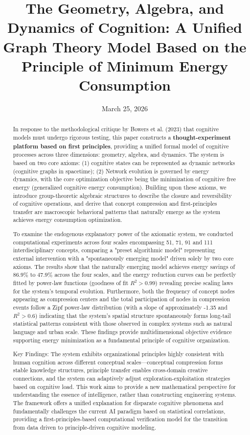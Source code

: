 \documentclass[10pt,onecolumn]{article}
\title{The Geometry, Algebra, and Dynamics of Cognition: A Unified Graph Theory Model Based on the Principle of Minimum Energy Consumption}
\date{March 25, 2026}
\begin{document}
\maketitle

\begin{abstract}
In response to the methodological critique by Bowers et al. (2023) that cognitive models must undergo rigorous testing, this paper constructs a \textbf{thought-experiment platform based on first principles}, providing a unified formal model of cognitive processes across three dimensions: geometry, algebra, and dynamics. The system is based on two core axioms: (1) cognitive states can be represented as dynamic networks (cognitive graphs in spacetime); (2) Network evolution is governed by energy dynamics, with the core optimization objective being the minimization of cognitive free energy (generalized cognitive energy consumption). Building upon these axioms, we introduce group-theoretic algebraic structures to describe the closure and reversibility of cognitive operations, and derive that concept compression and first-principles transfer are macroscopic behavioral patterns that naturally emerge as the system achieves energy consumption optimization.

To examine the endogenous explanatory power of the axiomatic system, we conducted computational experiments across four scales encompassing 51, 71, 91 and 111 interdisciplinary concepts, comparing a "preset algorithmic model" representing external intervention with a "spontaneously emerging model" driven solely by two core axioms. The results show that the naturally emerging model achieves energy savings of \(86.9\%\) to \(47.9\%\) across the four scales, and the energy reduction curves can be perfectly fitted by power-law functions (goodness of fit \(R^2 > 0.99\)) revealing precise scaling laws for the system's temporal evolution. Furthermore, both the frequency of concept nodes appearing as compression centers and the total participation of nodes in compression events follow a Zipf power-law distribution (with a slope of approximately -1.35 and \(R^2 > 0.6\)) indicating that the system's spatial structure spontaneously forms long-tail statistical patterns consistent with those observed in complex systems such as natural language and urban scale. These findings provide multidimensional objective evidence supporting energy minimization as a fundamental principle of cognitive organization.

Key Findings: The system exhibits organizational principles highly consistent with human cognition across different conceptual scales—conceptual compression forms stable knowledge structures, principle transfer enables cross-domain creative connections, and the system can adaptively adjust exploration-exploitation strategies based on cognitive load. This work aims to provide a new mathematical perspective for understanding the essence of intelligence, rather than constructing engineering systems. The framework offers a unified explanation for disparate cognitive phenomena and fundamentally challenges the current AI paradigm based on statistical correlations, providing a first-principles-based computational verification model for the transition from data driven to principle-driven cognitive modeling.


\end{abstract}
\end{document}
